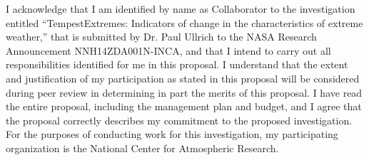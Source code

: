 \documentclass[11pt,stdletter,dateno,sigleft]{newlfm}
\begin{document}
\begin{newlfm}


I acknowledge that I am identified by name as Collaborator to the investigation entitled ``TempestExtremes: Indicators of change in the characteristics of extreme weather,'' that is submitted by Dr. Paul Ullrich to the NASA Research Announcement NNH14ZDA001N-INCA, and that I intend to carry out all responsibilities identified for me in this proposal. I understand that the extent and justification of my participation as stated in this proposal will be considered during peer review in determining in part the merits of this proposal. I have read the entire proposal, including the management plan and budget, and I agree that the proposal correctly describes my commitment to the proposed investigation. For the purposes of conducting work for this investigation, my participating organization is the National Center for Atmospheric Research.



\end{newlfm}
\end{document}
